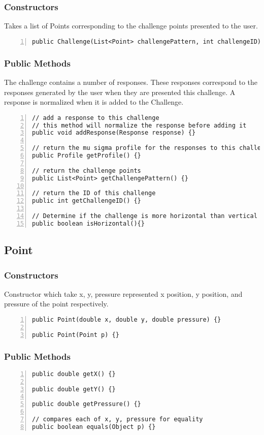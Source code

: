\documentclass{article} %
\begin{document}
\subsubsection{Constructors}
Takes a list of Points corresponding to the challenge points presented to the user.
\begin{lstlisting}[numbers=left]
public Challenge(List<Point> challengePattern, int challengeID) {}
\end{lstlisting}

\subsubsection{Public Methods}
The challenge contains a number of responses. These responses correspond to the responses generated by the user when they are presented this challenge. A response is normalized when it is added to the Challenge.
\begin{lstlisting}[numbers=left]
// add a response to this challenge
// this method will normalize the response before adding it
public void addResponse(Response response) {}

// return the mu sigma profile for the responses to this challenge
public Profile getProfile() {}

// return the challenge points
public List<Point> getChallengePattern() {}

// return the ID of this challenge
public int getChallengeID() {}

// Determine if the challenge is more horizontal than vertical in oreantation
public boolean isHorizontal(){}
\end{lstlisting}

\subsection{Point}
\subsubsection{Constructors}
Constructor which take x, y, pressure represented x position, y position, and pressure of the point respectively.
\begin{lstlisting}[numbers=left]
public Point(double x, double y, double pressure) {}

public Point(Point p) {}
\end{lstlisting}

\subsubsection{Public Methods}
\begin{lstlisting}[numbers=left]
public double getX() {}

public double getY() {}

public double getPressure() {}
    
// compares each of x, y, pressure for equality
public boolean equals(Object p) {}
\end{lstlisting}
\end{document}
